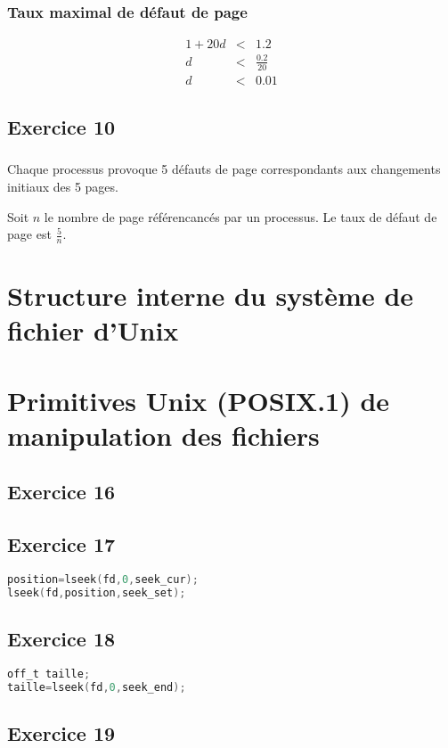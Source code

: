 \documentclass[12pt,a4paper,openany]{book}
\begin{document}
		\subsection{Taux maximal de défaut de page}
		\begin{eqnarray*}
			1 + 20d &<& 1.2\\
			d &<& \frac{0.2}{20}\\
			d &<& 0.01
		\end{eqnarray*}
		\section{Exercice 10}
		\subsection{}
			Chaque processus provoque 5 défauts de page correspondants aux changements initiaux des 5 pages.

			Soit $n$ le nombre de page référencancés par un processus. Le taux de défaut de page est $\frac{5}{n}$.
	\chapter{Structure interne du système de fichier d'Unix}
	\chapter{Primitives Unix (POSIX.1) de manipulation des fichiers}
		\section{Exercice 16}
		
		\section{Exercice 17}
		\begin{lstlisting}[language=C, caption=Exercice 17]
position=lseek(fd,0,seek_cur);
lseek(fd,position,seek_set);
		\end{lstlisting}
		\section{Exercice 18}
		\begin{lstlisting}[language=C, caption=Exercice 18]
off_t taille;
taille=lseek(fd,0,seek_end);
		\end{lstlisting}
		\section{Exercice 19}
		
\end{document}

